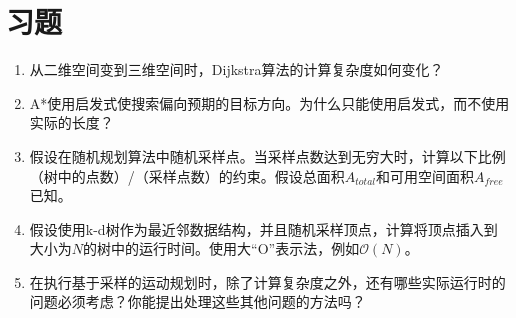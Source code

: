 \section*{习题}\small
\begin{enumerate}



\item 从二维空间变到三维空间时，Dijkstra算法的计算复杂度如何变化？
\item A*使用启发式使搜索偏向预期的目标方向。为什么只能使用启发式，而不使用实际的长度？
\item 假设在随机规划算法中随机采样点。当采样点数达到无穷大时，计算以下比例（树中的点数）/（采样点数）的约束。假设总面积$A_{total}$和可用空间面积$A_{free}$已知。
\item 假设使用k-d树作为最近邻数据结构，并且随机采样顶点，计算将顶点插入到大小为$N$的树中的运行时间。使用大“O”表示法，例如$\mathcal{O}(N)$。
\item 在执行基于采样的运动规划时，除了计算复杂度之外，还有哪些实际运行时的问题必须考虑？你能提出处理这些其他问题的方法吗？
\end{enumerate}
\normalsize
